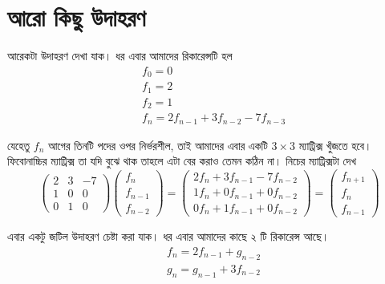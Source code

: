 \section{আরো কিছু উদাহরণ}

আরেকটা উদাহরণ দেখা যাক। ধর এবার আমাদের রিকারেন্সটি হল
\begin{align*}
& f_{0} = 0 \\
& f_{1} = 2 \\
& f_{2} = 1 \\
& f_{n} = 2f_{n - 1} + 3f_{n - 2} - 7f_{n - 3}
\end{align*}

যেহেতু $f_{n}$ আগের তিনটি পদের ওপর নির্ভরশীল, তাই আমাদের এবার একটি $3 \times 3$ ম্যাট্রিক্স খুঁজতে হবে। ফিবোনাচ্চির ম্যাট্রিক্স তা যদি বুঝে থাক তাহলে এটা বের করাও তেমন কঠিন না। নিচের ম্যাট্রিক্সটা দেখ
$$
\begin{pmatrix}
2 & 3 & -7 \\
1 & 0 & 0 \\
0 & 1 & 0
\end{pmatrix}
\begin{pmatrix}
f_{n} \\
f_{n - 1} \\
f_{n - 2}
\end{pmatrix}
=
\begin{pmatrix}
2f_{n} + 3f_{n - 1} - 7f_{n - 2}\\
1f_{n} + 0f_{n - 1} + 0f_{n - 2} \\
0f_{n} + 1f_{n - 1} + 0f_{n - 2}
\end{pmatrix}
=
\begin{pmatrix}
f_{n + 1} \\
f_{n} \\
f_{n - 1}
\end{pmatrix}
$$

এবার একটু জটিল উদাহরণ চেষ্টা করা যাক। ধর এবার আমাদের কাছে ২ টি রিকারেন্স আছে।
\begin{align*}
& f_{n} = 2f_{n - 1} + g_{n - 2} \\
& g_{n} = g_{n - 1} + 3f_{n - 2} \\
\end{align*}

